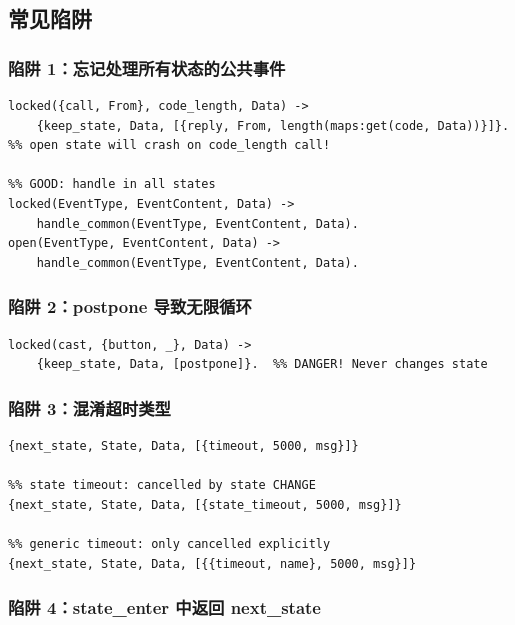 \documentclass[a4paper,11pt]{article}
\begin{document}
\subsection{常见陷阱}

\subsubsection{陷阱 1：忘记处理所有状态的公共事件}

\begin{lstlisting}[style=erlangstyle]
%% BAD: code_length only works in locked state
locked({call, From}, code_length, Data) ->
    {keep_state, Data, [{reply, From, length(maps:get(code, Data))}]}.
%% open state will crash on code_length call!

%% GOOD: handle in all states
locked(EventType, EventContent, Data) ->
    handle_common(EventType, EventContent, Data).
open(EventType, EventContent, Data) ->
    handle_common(EventType, EventContent, Data).
\end{lstlisting}

\subsubsection{陷阱 2：postpone 导致无限循环}

\begin{lstlisting}[style=erlangstyle]
%% BAD: postpone without state change = infinite loop
locked(cast, {button, _}, Data) ->
    {keep_state, Data, [postpone]}.  %% DANGER! Never changes state
\end{lstlisting}

\subsubsection{陷阱 3：混淆超时类型}

\begin{lstlisting}[style=erlangstyle]
%% event timeout: cancelled by ANY event
{next_state, State, Data, [{timeout, 5000, msg}]}

%% state timeout: cancelled by state CHANGE
{next_state, State, Data, [{state_timeout, 5000, msg}]}

%% generic timeout: only cancelled explicitly
{next_state, State, Data, [{{timeout, name}, 5000, msg}]}
\end{lstlisting}

\subsubsection{陷阱 4：state\_enter 中返回 next\_state}
\end{document}
